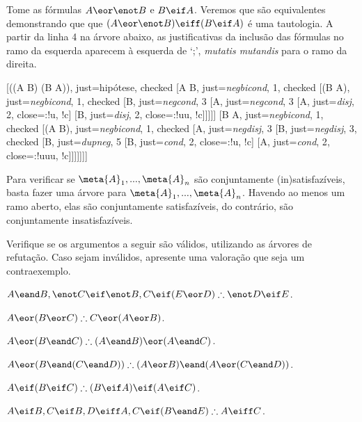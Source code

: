 Tome as fórmulas $A \eor \enot B$ e $B \eif A$.
Veremos que são equivalentes demonstrando que que $(A \eor \enot B) \eiff (B \eif A)$ é uma tautologia.
A partir da linha 4 na árvore abaixo, as justificativas da inclusão das fórmulas no ramo da esquerda aparecem à esquerda de `;', \emph{mutatis mutandis} para o ramo da direita.

	\begin{center}
		\begin{tableau}
			{
			}
			[\enot((A \eor \enot B) \eiff (B \eif A)), just=hipótese, checked
				[A \eor \enot B, just={\emph{negbicond}, 1}, checked
				[\enot(B \eif A), just={\emph{negbicond}, 1}, checked
					[B, just={\emph{negcond}, 3}
					[\enot A, just={\emph{negcond}, 3}
						[A, just={\emph{disj}, 2}, close={:!u, !c}]
						[\enot B, just={\emph{disj}, 2}, close={:!uu, !c}]]]]]
				[B \eif A, just={\emph{negbicond}, 1}, checked
				[\enot(A \eor \enot B), just={\emph{negbicond}, 1}, checked
				[\enot A, just={\emph{negdisj}, 3}
					[\enot \enot B, just={\emph{negdisj}, 3}, checked
					[B, just={\emph{dupneg}, 5}
						[\enot B, just={\emph{cond}, 2}, close={:!u, !c}]
						[A, just={\emph{cond}, 2}, close={:!uuu, !c}]]]]]]]
		\end{tableau}
	\end{center}

Para verificar se $\meta{A}_1, ..., \meta{A}_n$ são conjuntamente (in)satisfazíveis, basta fazer uma árvore para $\meta{A}_1, ..., \meta{A}_n$. 
Havendo ao menos um ramo aberto, elas são conjuntamente satisfazíveis, do contrário, são conjuntamente insatisfazíveis.

\practiceproblems

\problempart
\label{pr.TT.truthtrees.args}
Verifique se os argumentos a seguir são válidos, utilizando as árvores de refutação. Caso sejam inválidos, apresente uma valoração que seja um contraexemplo.
\begin{earg}
	\item $A \eand B, \enot C \eif \enot B, C \eif (E \eor D) \therefore \enot D \eif E$.
	\item $A \eor (B \eor C) \therefore C \eor (A \eor B)$.
	\item $A \eor (B \eand C) \therefore (A \eand B) \eor (A \eand C)$.
	\item $A \eor (B \eand (C \eand D)) \therefore (A \eor B) \eand (A \eor (C \eand D))$.
	\item $A \eif (B \eif C) \therefore (B \eif A) \eif (A \eif C)$.
	\item $A \eif B, C \eif B, D \eiff A, C \eif (B \eand E) \therefore A \eiff C$.
\end{earg}
